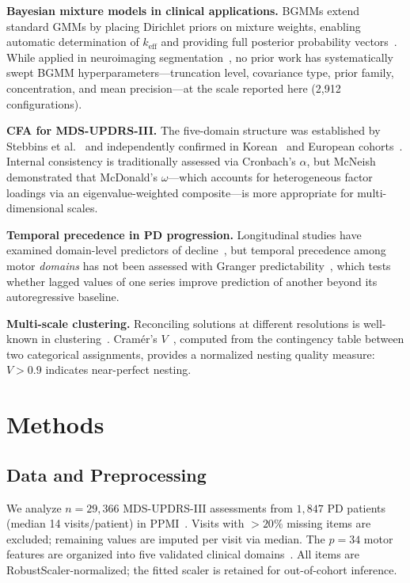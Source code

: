 \documentclass[runningheads]{llncs}
\begin{document}
\textbf{Bayesian mixture models in clinical applications.} BGMMs extend standard GMMs by placing Dirichlet priors on mixture weights, enabling automatic determination of $k_{\mathrm{eff}}$ and providing full posterior probability vectors~\cite{bishop2006pattern}. While applied in neuroimaging segmentation~\cite{vazquezledesma2025kmeans}, no prior work has systematically swept BGMM hyperparameters---truncation level, covariance type, prior family, concentration, and mean precision---at the scale reported here (2{,}912 configurations).

\textbf{CFA for MDS-UPDRS-III.} The five-domain structure was established by Stebbins et al.~\cite{stebbins2013clinimetric} and independently confirmed in Korean~\cite{koh2019confirmatory} and European cohorts~\cite{lohle2025optimizing}. Internal consistency is traditionally assessed via Cronbach's $\alpha$, but McNeish~\cite{mcneish2018thanks} demonstrated that McDonald's $\omega$---which accounts for heterogeneous factor loadings via an eigenvalue-weighted composite---is more appropriate for multi-dimensional scales.

\textbf{Temporal precedence in PD progression.} Longitudinal studies have examined domain-level predictors of decline~\cite{holden2022dissection,decock2024mci}, but temporal precedence among motor \emph{domains} has not been assessed with Granger predictability~\cite{granger1969investigating}, which tests whether lagged values of one series improve prediction of another beyond its autoregressive baseline.

\textbf{Multi-scale clustering.} Reconciling solutions at different resolutions is well-known in clustering~\cite{weingarten2022parkinsons}. Cram\'{e}r's $V$~\cite{cramer1946mathematical}, computed from the contingency table between two categorical assignments, provides a normalized nesting quality measure: $V > 0.9$ indicates near-perfect nesting.

\section{Methods}

\subsection{Data and Preprocessing}

We analyze $n{=}29{,}366$ MDS-UPDRS-III assessments from $1{,}847$ PD patients (median 14 visits/patient) in PPMI~\cite{ppmi2011}. Visits with ${>}20\%$ missing items are excluded; remaining values are imputed per visit via median. The $p{=}34$ motor features are organized into five validated clinical domains~\cite{stebbins2013clinimetric}. All items are RobustScaler-normalized; the fitted scaler is retained for out-of-cohort inference.
\end{document}
